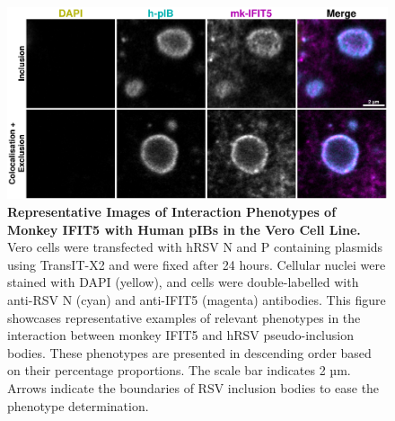 \begin{figure}
    \centering
    \includegraphics[width=1\linewidth]{09. Chapter 4/Figs/01. pIB/05. IFIT5/03. i5-vero-hnhp.pdf}
    \caption[Representative Images of Interaction Phenotypes of Monkey IFIT5 with Human pIBs in the Vero Cell Line.]{\textbf{Representative Images of Interaction Phenotypes of Monkey IFIT5 with Human pIBs in the Vero Cell Line.} Vero cells were transfected with hRSV N and P containing plasmids using TransIT-X2 and were fixed after 24 hours. Cellular nuclei were stained with DAPI (yellow), and cells were double-labelled with anti-RSV N (cyan) and anti-IFIT5 (magenta) antibodies. This figure showcases representative examples of relevant phenotypes in the interaction between monkey IFIT5 and hRSV pseudo-inclusion bodies. These phenotypes are presented in descending order based on their percentage proportions. The scale bar indicates 2 µm. Arrows indicate the boundaries of RSV inclusion bodies to ease the phenotype determination.}
    \label{fig:Representative Images of Interaction Phenotypes of Monkey IFIT5 with Human pIBs in the VERO Cell Line}
\end{figure}

